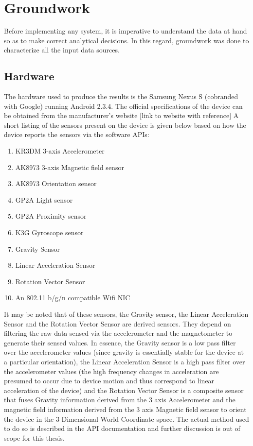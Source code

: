 \chapter{Groundwork\label{chap:groundwork}}


Before implementing any system, it is imperative to understand the data at hand
so as to make correct analytical decisions. In this regard, groundwork was done
to characterize all the input data sources.

\section{Hardware}
The hardware used to produce the results is the Samsung Nexus S (cobranded with
Google) running Android 2.3.4. The official specifications of the device can be
obtained from the manufacturer's website [link to website with reference] A
short listing of the sensors present on the device is given below based on how
the device reports the sensors via the software APIs:

\begin{enumerate}
\item KR3DM 3-axis Accelerometer
\item AK8973 3-axis Magnetic field sensor
\item AK8973 Orientation sensor
\item GP2A Light sensor
\item GP2A Proximity sensor
\item K3G Gyroscope sensor
\item Gravity Sensor
\item Linear Acceleration Sensor
\item Rotation Vector Sensor
\item An 802.11 b/g/n compatible Wifi NIC
\end{enumerate}

It may be noted that of these sensors, the Gravity sensor, the Linear
Acceleration Sensor and the Rotation Vector Sensor are derived sensors. They
depend on filtering the raw data sensed via the accelerometer and the
magnetometer to generate their sensed values. In essence, the Gravity sensor is
a low pass filter over the accelerometer values (since gravity is essentially
stable for the device at a particular orientation), the Linear Acceleration
Sensor is a high pass filter over the accelerometer values (the high frequency
changes in acceleration are presumed to occur due to device motion and thus
correspond to linear acceleration of the device) and the Rotation Vector Sensor
is a composite sensor that fuses Gravity information derived from the
3 axis Accelerometer and the magnetic field information derived from the
3 axis Magnetic field sensor to orient the device in the 3 Dimensional World 
Coordinate space. The actual method used to do so is described in the API
documentation \cite{AndroidSensorManager} and
further discussion is out of scope for this thesis.


